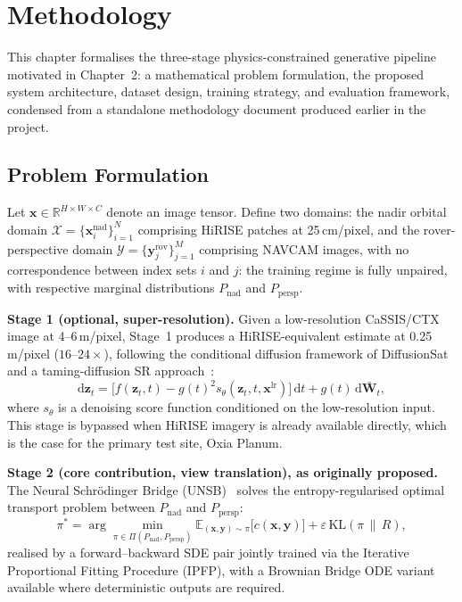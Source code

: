 \chapter{Methodology}
\label{ch:methodology}

This chapter formalises the three-stage physics-constrained generative pipeline motivated in Chapter~2: a mathematical problem formulation, the proposed system architecture, dataset design, training strategy, and evaluation framework, condensed from a standalone methodology document produced earlier in the project.

\section{Problem Formulation}
\label{sec:formulation}

Let $\mathbf{x} \in \mathbb{R}^{H \times W \times C}$ denote an image tensor. Define two domains: the nadir orbital domain $\mathcal{X} = \{\mathbf{x}_i^{\mathrm{nad}}\}_{i=1}^{N}$ comprising HiRISE patches at 25\,cm/pixel, and the rover-perspective domain $\mathcal{Y} = \{\mathbf{y}_j^{\mathrm{rov}}\}_{j=1}^{M}$ comprising NAVCAM images, with no correspondence between index sets $i$ and $j$: the training regime is fully unpaired, with respective marginal distributions $P_{\mathrm{nad}}$ and $P_{\mathrm{persp}}$.

\textbf{Stage 1 (optional, super-resolution).} Given a low-resolution CaSSIS/CTX image at 4--6\,m/pixel, Stage~1 produces a HiRISE-equivalent estimate at 0.25\,m/pixel ($16$--$24\times$), following the conditional diffusion framework of DiffusionSat~\cite{khanna2024diffusionsat} and a taming-diffusion SR approach~\cite{zhu2025taming}:
\begin{equation}
  \mathrm{d}\mathbf{z}_t = \bigl[f(\mathbf{z}_t, t)
    - g(t)^2 s_\theta(\mathbf{z}_t, t, \mathbf{x}^{\mathrm{lr}})\bigr]\,\mathrm{d}t
    + g(t)\,\mathrm{d}\bar{\mathbf{W}}_t,
  \label{eq:sr_sde}
\end{equation}
where $s_\theta$ is a denoising score function conditioned on the low-resolution input. This stage is bypassed when HiRISE imagery is already available directly, which is the case for the primary test site, Oxia Planum.

\textbf{Stage 2 (core contribution, view translation), as originally proposed.} The Neural Schr\"{o}dinger Bridge (UNSB)~\cite{kim2024unsb} solves the entropy-regularised optimal transport problem between $P_{\mathrm{nad}}$ and $P_{\mathrm{persp}}$:
\begin{equation}
  \pi^* = \arg\min_{\pi \in \Pi(P_{\mathrm{nad}}, P_{\mathrm{persp}})}
    \mathbb{E}_{(\mathbf{x},\mathbf{y}) \sim \pi}
    \bigl[c(\mathbf{x}, \mathbf{y})\bigr]
    + \varepsilon \, \mathrm{KL}(\pi \,\|\, R),
  \label{eq:sb_ot}
\end{equation}
realised by a forward--backward SDE pair jointly trained via the Iterative Proportional Fitting Procedure (IPFP), with a Brownian Bridge ODE variant~\cite{xiao2025brownian} available where deterministic outputs are required.

